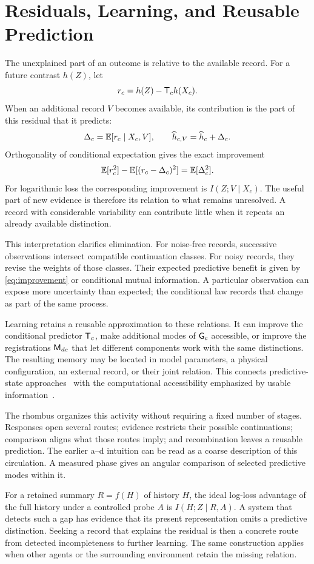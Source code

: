 \section{Residuals, Learning, and Reusable Prediction}
\label{sec:learning}
The unexplained part of an outcome is relative to the available record. For a future contrast \(h(Z)\), let
\begin{equation*}
r_c=h(Z)-\mathsf T_ch(X_c).
\end{equation*}
When an additional record \(V\) becomes available, its contribution is the part of this residual that it predicts:
\begin{equation}
\Delta_c=\mathbb E[r_c\mid X_c,V],\qquad
\widehat h_{c,V}=\widehat h_c+\Delta_c.
\label{eq:residual}
\end{equation}
Orthogonality of conditional expectation gives the exact improvement
\begin{equation}
\mathbb E[r_c^2]-\mathbb E[(r_c-\Delta_c)^2]=\mathbb E[\Delta_c^2].
\label{eq:improvement}
\end{equation}
For logarithmic loss the corresponding improvement is \(I(Z;V\mid X_c)\). The useful part of new evidence is therefore its relation to what remains unresolved. A record with considerable variability can contribute little when it repeats an already available distinction.

This interpretation clarifies elimination. For noise-free records, successive observations intersect compatible continuation classes. For noisy records, they revise the weights of those classes. Their expected predictive benefit is given by \cref{eq:improvement} or conditional mutual information. A particular observation can expose more uncertainty than expected; the conditional law records that change as part of the same process.

Learning retains a reusable approximation to these relations. It can improve the conditional predictor \(\mathsf T_c\), make additional modes of \(\mathsf G_c\) accessible, or improve the registrations \(\mathsf M_{dc}\) that let different components work with the same distinctions. The resulting memory may be located in model parameters, a physical configuration, an external record, or their joint relation. This connects predictive-state approaches~\citep{shalizi2001} with the computational accessibility emphasized by usable information~\citep{xu2020}.

The rhombus organizes this activity without requiring a fixed number of stages. Responses open several routes; evidence restricts their possible continuations; comparison aligns what those routes imply; and recombination leaves a reusable prediction. The earlier a--d intuition can be read as a coarse description of this circulation. A measured phase gives an angular comparison of selected predictive modes within it.

For a retained summary \(R=f(H)\) of history \(H\), the ideal log-loss advantage of the full history under a controlled probe \(A\) is \(I(H;Z\mid R,A)\). A system that detects such a gap has evidence that its present representation omits a predictive distinction. Seeking a record that explains the residual is then a concrete route from detected incompleteness to further learning. The same construction applies when other agents or the surrounding environment retain the missing relation.

